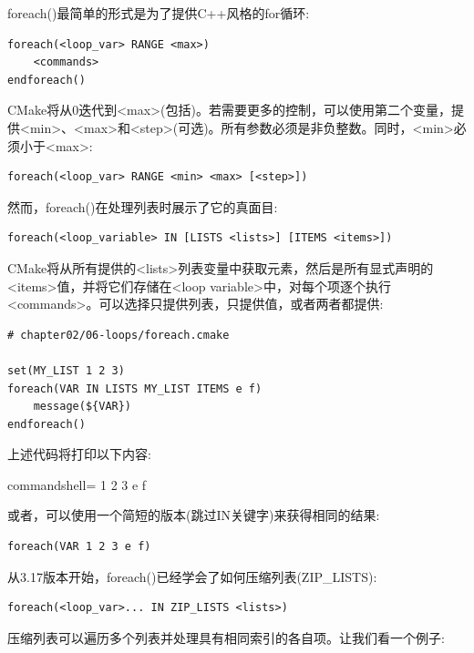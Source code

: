 foreach()最简单的形式是为了提供C++风格的for循环:

\begin{lstlisting}[style=styleCMake]
foreach(<loop_var> RANGE <max>)
	<commands>
endforeach()
\end{lstlisting}

CMake将从0迭代到<max>(包括)。若需要更多的控制，可以使用第二个变量，提供<min>、<max>和<step>(可选)。所有参数必须是非负整数。同时，<min>必须小于<max>:

\begin{lstlisting}[style=styleCMake]
foreach(<loop_var> RANGE <min> <max> [<step>])
\end{lstlisting}

然而，foreach()在处理列表时展示了它的真面目:

\begin{lstlisting}[style=styleCMake]
foreach(<loop_variable> IN [LISTS <lists>] [ITEMS <items>])
\end{lstlisting}

CMake将从所有提供的<lists>列表变量中获取元素，然后是所有显式声明的<items>值，并将它们存储在<loop variable>中，对每个项逐个执行<commands>。可以选择只提供列表，只提供值，或者两者都提供:

\begin{lstlisting}[style=styleCMake]
# chapter02/06-loops/foreach.cmake

set(MY_LIST 1 2 3)
foreach(VAR IN LISTS MY_LIST ITEMS e f)
	message(${VAR})
endforeach()
\end{lstlisting}

上述代码将打印以下内容:

\begin{tcblisting}{commandshell={}}
1 
2 
3 
e 
f
\end{tcblisting}

或者，可以使用一个简短的版本(跳过IN关键字)来获得相同的结果:

\begin{lstlisting}[style=styleCMake]
foreach(VAR 1 2 3 e f)
\end{lstlisting}

从3.17版本开始，foreach()已经学会了如何压缩列表(ZIP\_LISTS):

\begin{lstlisting}[style=styleCMake]
foreach(<loop_var>... IN ZIP_LISTS <lists>)
\end{lstlisting}

压缩列表可以遍历多个列表并处理具有相同索引的各自项。让我们看一个例子:

